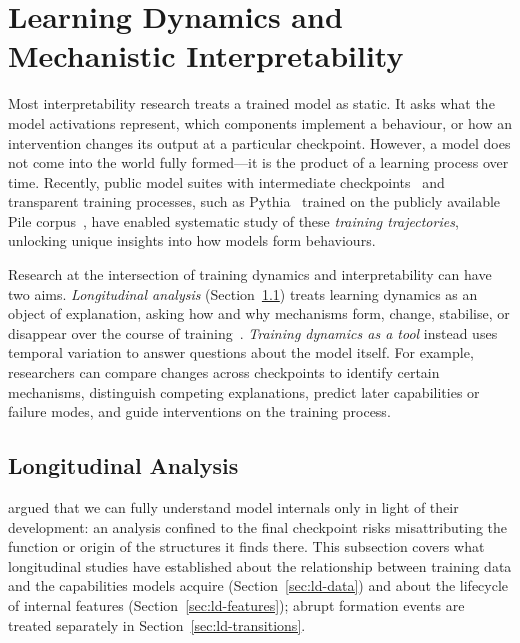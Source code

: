 \section{Learning Dynamics and Mechanistic Interpretability}
\label{sec:training}

Most interpretability research treats a trained model as static. It asks what the model activations represent, which components implement a behaviour, or how an intervention changes its output at a particular checkpoint. However, a model does not come into the world fully formed---it is the product of a learning process over time. Recently, public model suites with intermediate checkpoints~ and transparent training processes, such as Pythia~ trained on the publicly available Pile corpus~, have enabled systematic study of these \emph{training trajectories}, unlocking unique insights into how models form behaviours.

Research at the intersection of training dynamics and interpretability can have two aims. \emph{Longitudinal analysis} (Section~\ref{sec:ld-longitudinal}) treats learning dynamics as an object of explanation, asking how and why mechanisms form, change, stabilise, or disappear over the course of training~. \emph{Training dynamics as a tool} instead uses temporal variation to answer questions about the model itself. For example, researchers can compare changes across checkpoints to identify certain mechanisms, distinguish competing explanations, predict later capabilities or failure modes, and guide interventions on the training process.

\subsection{Longitudinal Analysis}
\label{sec:ld-longitudinal}

 argued that we can fully understand model internals only in light of their development: an analysis confined to the final checkpoint risks misattributing the function or origin of the structures it finds there. This subsection covers what longitudinal studies have established about the relationship between training data and the capabilities models acquire (Section~\ref{sec:ld-data}) and about the lifecycle of internal features (Section~\ref{sec:ld-features}); abrupt formation events are treated separately in Section~\ref{sec:ld-transitions}.


